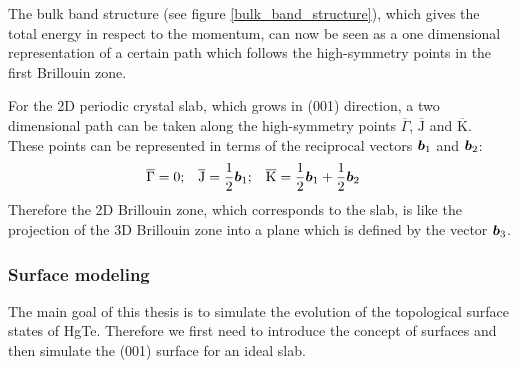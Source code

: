 		The bulk band structure (see figure \ref{bulk_band_structure}), which gives the total energy in respect to the momentum, can now be seen as a one dimensional representation of a certain path which follows the high-symmetry points in the first Brillouin zone. 
		
		For the 2D periodic crystal slab, which grows in (001) direction, a two dimensional path can be taken along the high-symmetry points $\overline{\Gamma}$, $\overline{\text{J}}$ and $\overline{\text{K}}$. These points can be represented in terms of the reciprocal vectors $\boldsymbol{b}_1$ and $\boldsymbol{b}_2$:
		\begin{align} \label{2D-BZ-points}
			\overline{\Gamma}&= 0;&
			\overline{\text{J}} &= \frac{1}{2} \boldsymbol{b}_1 ;&
			\overline{\text{K}}&= \frac{1}{2} \boldsymbol{b}_1 + \frac{1}{2} \boldsymbol{b}_2 
		\end{align}
		Therefore the 2D Brillouin zone, which corresponds to the slab, is like the projection of the 3D Brillouin zone into a plane which is defined by the vector $\boldsymbol{b}_3$. 
		
	\subsubsection{Surface modeling} \label{surface_modeling}
%		
		The main goal of this thesis is to simulate the evolution of the topological surface states of HgTe. Therefore we first need to introduce the concept of surfaces and then simulate the (001) surface for an ideal slab. 
		
